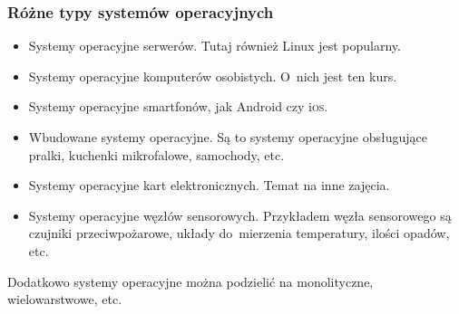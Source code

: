 \documentclass[10pt,t]{beamer}
\begin{document}
\begin{frame}
  \frametitle{Różne typy systemów operacyjnych}


  \begin{itemize}

  \item Systemy operacyjne serwerów. Tutaj również Linux jest popularny.

  \item Systemy operacyjne komputerów osobistych. O~nich jest ten kurs.

  \item Systemy operacyjne smartfonów, jak Android czy i\textsc{os}.

  \item Wbudowane systemy operacyjne. Są to systemy operacyjne obsługujące
    pralki, kuchenki mikrofalowe, samochody, etc.

  \item Systemy operacyjne kart elektronicznych. Temat na inne zajęcia.

  \item Systemy operacyjne węzłów sensorowych. Przykładem węzła sensorowego
    są czujniki przeciwpożarowe, układy do~mierzenia temperatury, ilości
    opadów, etc.

  \end{itemize}

  Dodatkowo systemy operacyjne można podzielić na monolityczne,
  wielowarstwowe, etc.

\end{frame}
\end{document}
